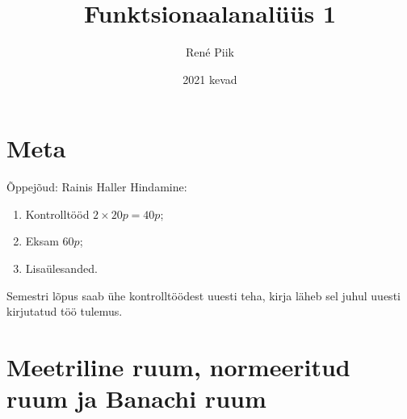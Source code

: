 \documentclass{article}[12pt]
\theoremstyle{definition}
\theoremstyle{definition}
\theoremstyle{definition}
\theoremstyle{break}
\begin{document}
\title{Funktsionaalanalüüs 1}
\author{René Piik}
\date{2021 kevad}

\maketitle

\section*{Meta}

Õppejõud: Rainis Haller \newline
Hindamine:
\begin{enumerate}
	\item Kontrolltööd $2\times 20p = 40p$;
	\item Eksam $60p$;
	\item Lisaülesanded.
\end{enumerate}
Semestri lõpus saab ühe kontrolltöödest uuesti teha, kirja läheb sel juhul uuesti kirjutatud töö tulemus.

\tableofcontents

\section{Meetriline ruum, normeeritud ruum ja Banachi ruum}
\end{document}
